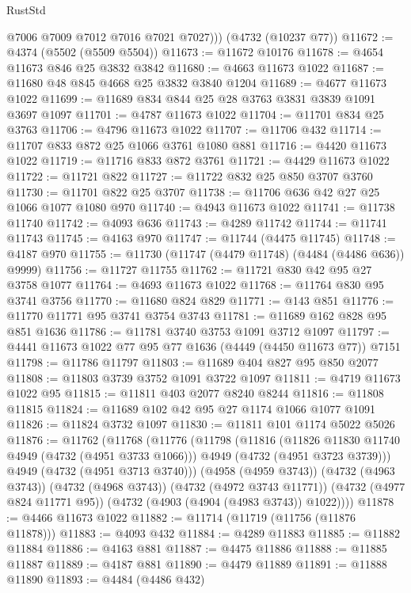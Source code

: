 \begin{lexlean}{RustStd}
\begin{coremodule}
{\begin{coremodule}
{{{{{{{{{{{{{{          @7006
          @7009
          @7012
          @7016
          @7021
          @7027)))
    (@4732 (@10237 @77))
@11672 := @4374 (@5502 (@5509 @5504))
@11673 := @11672 @10176
@11678 := @4654 @11673 @846 @25 @3832 @3842
@11680 := @4663 @11673 @1022
@11687 := @11680 @48 @845 @4668 @25 @3832 @3840 @1204
@11689 := @4677 @11673 @1022
@11699 := @11689 @834 @844 @25 @28 @3763 @3831 @3839 @1091 @3697 @1097
@11701 := @4787 @11673 @1022
@11704 := @11701 @834 @25 @3763
@11706 := @4796 @11673 @1022
@11707 := @11706 @432
@11714 := @11707 @833 @872 @25 @1066 @3761 @1080 @881
@11716 := @4420 @11673 @1022
@11719 := @11716 @833 @872 @3761
@11721 := @4429 @11673 @1022
@11722 := @11721 @822
@11727 := @11722 @832 @25 @850 @3707 @3760
@11730 := @11701 @822 @25 @3707
@11738 := @11706 @636 @42 @27 @25 @1066 @1077 @1080 @970
@11740 := @4943 @11673 @1022
@11741 := @11738 @11740
@11742 := @4093 @636
@11743 := @4289 @11742
@11744 := @11741 @11743
@11745 := @4163 @970
@11747 := @11744 (@4475 @11745)
@11748 := @4187 @970
@11755 := @11730 (@11747 (@4479 @11748) (@4484 (@4486 @636)) @9999)
@11756 := @11727 @11755
@11762 := @11721 @830 @42 @95 @27 @3758 @1077
@11764 := @4693 @11673 @1022
@11768 := @11764 @830 @95 @3741 @3756
@11770 := @11680 @824 @829
@11771 := @143 @851
@11776 := @11770 @11771 @95 @3741 @3754 @3743
@11781 := @11689 @162 @828 @95 @851 @1636
@11786 := @11781 @3740 @3753 @1091 @3712 @1097
@11797 := @4441 @11673 @1022 @77 @95 @77 @1636 (@4449 (@4450 @11673 @77)) @7151
@11798 := @11786 @11797
@11803 := @11689 @404 @827 @95 @850 @2077
@11808 := @11803 @3739 @3752 @1091 @3722 @1097
@11811 := @4719 @11673 @1022 @95
@11815 := @11811 @403 @2077 @8240 @8244
@11816 := @11808 @11815
@11824 := @11689 @102 @42 @95 @27 @1174 @1066 @1077 @1091
@11826 := @11824 @3732 @1097
@11830 := @11811 @101 @1174 @5022 @5026
@11876 := @11762
    (@11768
      (@11776
        (@11798
          (@11816
            (@11826 @11830 @11740 @4949 (@4732 (@4951 @3733 @1066)))
            @4949
            (@4732 (@4951 @3723 @3739)))
          @4949
          (@4732 (@4951 @3713 @3740)))
        (@4958 (@4959 @3743))
        (@4732 (@4963 @3743))
        (@4732 (@4968 @3743))
        (@4732 (@4972 @3743 @11771))
        (@4732 (@4977 @824 @11771 @95))
        (@4732 (@4903 (@4904 (@4983 @3743)) @1022))))
@11878 := @4466 @11673 @1022
@11882 := @11714 (@11719 (@11756 (@11876 @11878)))
@11883 := @4093 @432
@11884 := @4289 @11883
@11885 := @11882 @11884
@11886 := @4163 @881
@11887 := @4475 @11886
@11888 := @11885 @11887
@11889 := @4187 @881
@11890 := @4479 @11889
@11891 := @11888 @11890
@11893 := @4484 (@4486 @432)
}}}}}}}}}}}}}}
\end{coremodule}}
\end{coremodule}
\end{lexlean}
